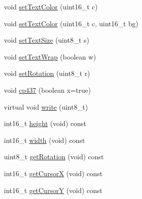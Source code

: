 \begin{DoxyCompactItemize}
\item 
void \hyperlink{class_adafruit___g_f_x_a59178a0e0c845a14a39b457c43567dd9}{set\+Text\+Color} (uint16\+\_\+t c)
\item 
void \hyperlink{class_adafruit___g_f_x_ab6e88c585d3ab6b4f95199361f224fc6}{set\+Text\+Color} (uint16\+\_\+t c, uint16\+\_\+t bg)
\item 
void \hyperlink{class_adafruit___g_f_x_a39eb4a8a2c9fa4ab7d58ceffd19535d5}{set\+Text\+Size} (uint8\+\_\+t s)
\item 
void \hyperlink{class_adafruit___g_f_x_aeeacd62bf26f3e7abbdc4b5b50faa6fa}{set\+Text\+Wrap} (boolean w)
\item 
void \hyperlink{class_adafruit___g_f_x_a6ac337c49876cee23ed062a928724675}{set\+Rotation} (uint8\+\_\+t r)
\item 
void \hyperlink{class_adafruit___g_f_x_a6d447fe274e3f0ff12f12afa538d0afe}{cp437} (boolean x=true)
\item 
virtual void \hyperlink{class_adafruit___g_f_x_af4978ea0cf0c0b0540567e82d8fa9900}{write} (uint8\+\_\+t)
\item 
int16\+\_\+t \hyperlink{class_adafruit___g_f_x_a49da524caa19e5202ed2ed7fd5a3baea}{height} (void) const
\item 
int16\+\_\+t \hyperlink{class_adafruit___g_f_x_a324b5361e7198ef0e79eaf4c80bddfc7}{width} (void) const
\item 
uint8\+\_\+t \hyperlink{class_adafruit___g_f_x_ab90e1378511b93189a7b557d7dda5d73}{get\+Rotation} (void) const
\item 
int16\+\_\+t \hyperlink{class_adafruit___g_f_x_a0d1d15f5f15cad95b4c20f0e9ac9c74b}{get\+CursorX} (void) const
\item 
int16\+\_\+t \hyperlink{class_adafruit___g_f_x_a81c8558cfcb717c4cfbd5475998daed1}{get\+CursorY} (void) const
\end{DoxyCompactItemize}
